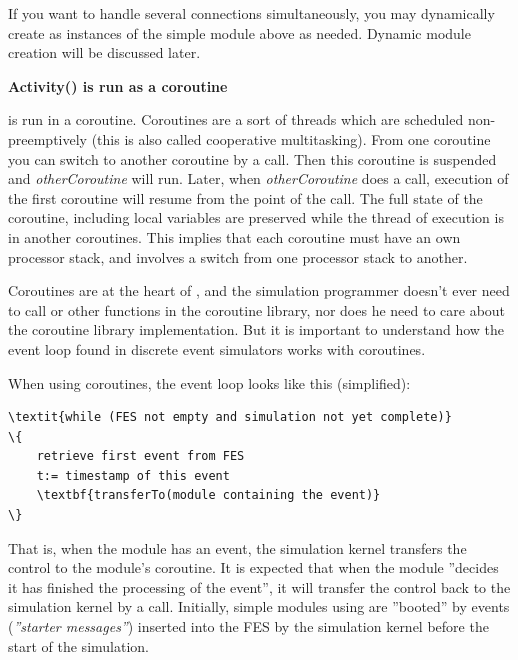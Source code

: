 If you want to handle several connections simultaneously, you may
dynamically create as instances of the simple
module above as needed. Dynamic module creation will be discussed
later.


\textbf{Activity() is run as a coroutine}


 is run in a coroutine.
Coroutines are a sort of threads which are scheduled
non-preemptively (this is also called cooperative
multitasking). From one coroutine you
can switch to another coroutine by a
 call. Then this
coroutine is suspended and \textit{otherCoroutine} will run. Later,
when \textit{otherCoroutine} does a
 call, execution of
the first coroutine will resume from the point of the
 call.  The full state
of the coroutine, including local variables are preserved while the
thread of execution is in another coroutines.  This implies that each
coroutine must have an own processor stack, and
 involves a switch from one processor stack to
another.


Coroutines are at the heart of {\opp}, and the
simulation programmer doesn't ever need to call 
or other functions in the coroutine library, nor does he need to care
about the coroutine library implementation. But it is important to
understand how the event loop found in discrete event simulators works
with coroutines.


When using coroutines, the event loop looks like
this (simplified):


\begin{Verbatim}[commandchars=\\\{\}]
\textit{while (FES not empty and simulation not yet complete)}
\{
    retrieve first event from FES
    t:= timestamp of this event
    \textbf{transferTo(module containing the event)}
\}
\end{Verbatim}
  


That is, when the module has an event, the simulation
kernel transfers the control to the module's coroutine. It is expected
that when the module ''decides it has finished the processing of the
event'', it will transfer the control back to the simulation kernel by
a  call. Initially,
simple modules using  are
''booted'' by events (\textit{''starter messages''})
inserted into the FES by the simulation kernel before the
start of the simulation.


